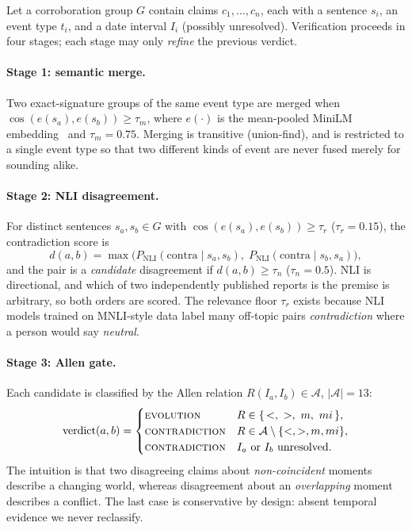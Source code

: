 Let a corroboration group $G$ contain claims $c_1,\dots,c_n$, each with a
sentence $s_i$, an event type $t_i$, and a date interval $I_i$ (possibly
unresolved). Verification proceeds in four stages; each stage may only
\emph{refine} the previous verdict.

\paragraph{Stage 1: semantic merge.}
Two exact-signature groups of the same event type are merged when
$\cos(e(s_a), e(s_b)) \ge \tau_m$, where $e(\cdot)$ is the mean-pooled
MiniLM embedding~\cite{wang2020minilm} and $\tau_m{=}0.75$. Merging is
transitive (union-find), and is restricted to a single event type so that two
different kinds of event are never fused merely for sounding alike.

\paragraph{Stage 2: NLI disagreement.}
For distinct sentences $s_a, s_b \in G$ with
$\cos(e(s_a),e(s_b)) \ge \tau_r$ ($\tau_r{=}0.15$), the contradiction score is
\begin{equation}
  d(a,b) = \max\bigl(P_{\text{NLI}}(\text{contra}\mid s_a, s_b),\;
                     P_{\text{NLI}}(\text{contra}\mid s_b, s_a)\bigr),
\end{equation}
and the pair is a \emph{candidate} disagreement if $d(a,b) \ge \tau_n$
($\tau_n{=}0.5$). NLI is directional, and which of two independently
published reports is the premise is arbitrary, so both orders are scored.
The relevance floor $\tau_r$ exists because NLI models trained on MNLI-style
data label many off-topic pairs \emph{contradiction} where a person would say
\emph{neutral}.

\paragraph{Stage 3: Allen gate.}
Each candidate is classified by the Allen relation
$R(I_a, I_b) \in \mathcal{A}$, $|\mathcal{A}|{=}13$:
\begin{equation}
  \text{verdict}(a,b) =
  \begin{cases}
    \textsc{evolution}      & R \in \{\,<,\ >,\ m,\ mi\,\},\\
    \textsc{contradiction}  & R \in \mathcal{A}\setminus\{<,>,m,mi\},\\
    \textsc{contradiction}  & I_a \text{ or } I_b \text{ unresolved.}
  \end{cases}
\end{equation}
The intuition is that two disagreeing claims about \emph{non-coincident}
moments describe a changing world, whereas disagreement about an
\emph{overlapping} moment describes a conflict. The last case is conservative
by design: absent temporal evidence we never reclassify.

